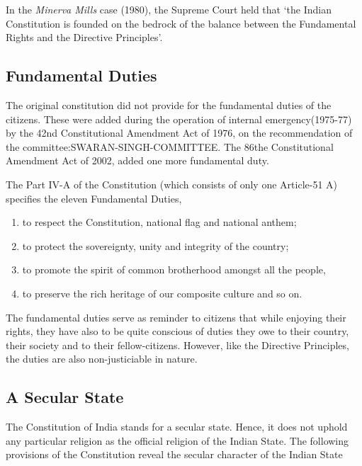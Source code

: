 \begin{multicol}{2}
In the { \textit{Minerva Mills}} case (1980), the Supreme Court held that `the Indian Constitution is founded on the bedrock of the balance between the Fundamental Rights and the Directive Principles'.

\subsection{Fundamental Duties}

The original constitution did not provide for the fundamental duties of the citizens. These were added during the operation of internal emergency(1975-77) by the 42nd Constitutional Amendment Act of 1976, on the recommendation of the \gls{committee:SWARAN-SINGH-COMMITTEE}. The 86the Constitutional Amendment Act of 2002, added one more fundamental duty.

The Part IV-A of the Constitution (which consists of only one Article-51 A) specifies the eleven Fundamental Duties,

\renewcommand{\labelenumi}{\textbf{(\alph{enumi})}}
\begin{enumerate}
  \item to respect the Constitution, national flag and national anthem;
  \item to protect the sovereignty, unity and integrity of the country;
  \item to promote the spirit of common brotherhood amongst all the people,
  \item to preserve the rich heritage of our composite culture and so on.
\end{enumerate}

The fundamental duties serve as reminder to citizens that while enjoying their rights, they have also to be quite conscious of duties they owe to their country, their society and to their fellow-citizens. However, like the Directive Principles, the duties are also non-justiciable in nature.


\subsection{A Secular State}

The Constitution of India stands for a secular state. Hence, it does not uphold any particular religion as the official religion of the Indian State. The following provisions of the Constitution reveal the secular character of the Indian State


\end{multicol}
